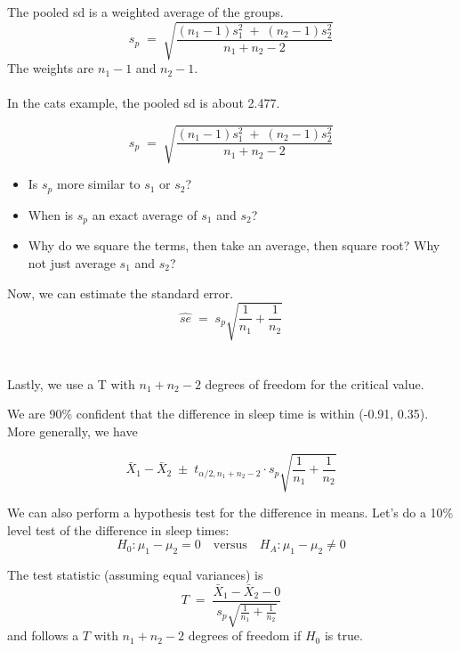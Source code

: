 \documentclass[xcolor={dvipsnames,svgnames},14pt]{beamer}
\begin{document}
\begin{frame}
The pooled sd is a weighted average of the groups.  
$$s_p \;=\; \sqrt{\frac{(n_{1}-1)s_{1}^2 \;+\; (n_{2}-1)s_{2}^2}{n_{1} + n_{2} - 2}}$$ 
The weights are $n_1-1$ and $n_2-1$. \\~\\
In the cats example, the pooled sd is about 2.477.
\end{frame}

\begin{frame}
$$s_p \;=\; \sqrt{\frac{(n_{1}-1)s_{1}^2 \;+\; (n_{2}-1)s_{2}^2}{n_{1} + n_{2} - 2}}$$ 
\begin{itemize}
\item Is $s_p$ more similar to $s_1$ or $s_2$?
\item When is $s_p$ an exact average of $s_1$ and $s_2$?
\item[$\bigstar$] Why do we square the terms, then take an average, then square root?  Why not just average $s_1$ and $s_2$?
\end{itemize}
\end{frame}

\begin{frame}
Now, we can estimate the standard error.
$$\hat{se} \;=\; s_p \sqrt{\frac{1}{n_1} + \frac{1}{n_2}}$$ \\~\\
Lastly, we use a T with $n_1 + n_2 - 2$ degrees of freedom for the critical value.
\end{frame}

\begin{frame}
We are 90\% confident that the difference in sleep time is within (-0.91, 0.35).  More generally, we have

$$\bar{X}_1 - \bar{X}_2 \;\pm\; t_{\alpha/2, n_1+n_2-2}\cdot  s_p\sqrt{\frac{1}{n_1} + \frac{1}{n_2}}$$
\end{frame}

\begin{frame}
We can also perform a hypothesis test for the difference in means. Let's do a 10\% level test of the difference in sleep times: 
$$H_0: \mu_1 - \mu_2 = 0 \quad \text{versus} \quad H_A: \mu_1 - \mu_2 \neq 0$$
\end{frame}

\begin{frame}
The test statistic (assuming equal variances) is 
$$T \;=\; \frac{\bar{X}_1 - \bar{X}_2 - 0}{s_p \sqrt{\frac{1}{n_1} + \frac{1}{n_2}}}$$
and follows a $T$ with $n_1 + n_2 - 2$ degrees of freedom if $H_0$ is true.
\end{frame}
\end{document}
